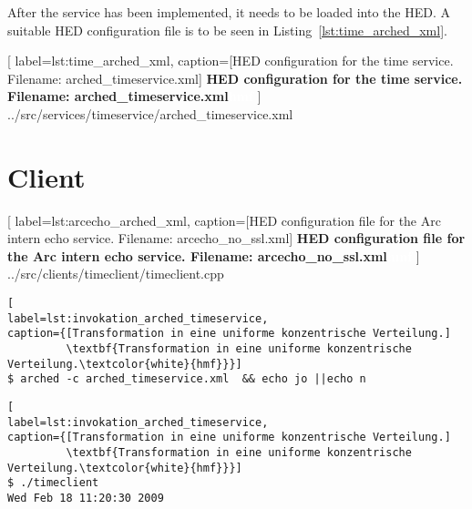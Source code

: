 After the service has been implemented, it needs to be loaded into the HED. A suitable HED configuration file is to be seen in Listing~\ref{lst:time_arched_xml}.




\begin{minipage}[t]{\textwidth}

	[
	label=lst:time_arched_xml,
	caption={[HED configuration for the time service. Filename: arched\_timeservice.xml]
	\textbf{HED configuration for the time service. Filename: arched\_timeservice.xml\textcolor{white}{hmf}}}
	]
{../src/services/timeservice/arched_timeservice.xml}
\end{minipage}


\section{Client}




	[
	label=lst:arcecho_arched_xml,
	caption={[HED configuration file for the Arc intern echo service. Filename: arcecho\_no\_ssl.xml]
	\textbf{HED configuration file for the Arc intern echo service. Filename: arcecho\_no\_ssl.xml\textcolor{white}{hmf}}}
	]
{../src/clients/timeclient/timeclient.cpp}




\begin{minipage}[t]{\textwidth}
\begin{lstlisting}[
label=lst:invokation_arched_timeservice,
caption={[Transformation in eine uniforme konzentrische Verteilung.]
         \textbf{Transformation in eine uniforme konzentrische Verteilung.\textcolor{white}{hmf}}}]
$ arched -c arched_timeservice.xml  && echo jo ||echo n
\end{lstlisting}
\end{minipage}



\begin{minipage}[t]{\textwidth}
\begin{lstlisting}[
label=lst:invokation_arched_timeservice,
caption={[Transformation in eine uniforme konzentrische Verteilung.]
         \textbf{Transformation in eine uniforme konzentrische Verteilung.\textcolor{white}{hmf}}}]
$ ./timeclient
Wed Feb 18 11:20:30 2009
\end{lstlisting}
\end{minipage}



